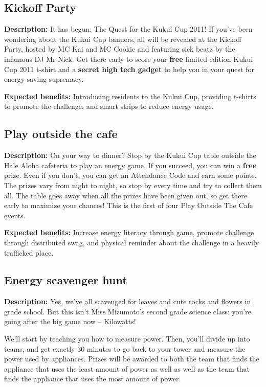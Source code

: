 \subsection{Kickoff Party}

\textbf{Description:} It has begun: The Quest for the Kukui Cup 2011! If you've been wondering about the Kukui Cup banners, all will be revealed at the Kickoff Party, hosted by MC Kai and MC Cookie and featuring sick beatz by the infamous DJ Mr Nick. Get there early to score your \textbf{free} limited edition Kukui Cup 2011 t-shirt and a \textbf{secret high tech gadget} to help you in your quest for energy saving supremacy.

\vspace{2ex}
\textbf{Expected benefits:} Introducing residents to the Kukui Cup, providing t-shirts to promote the challenge, and smart strips to reduce energy usage.


\subsection{Play outside the cafe}

\textbf{Description:} On your way to dinner? Stop by the Kukui Cup table outside the Hale Aloha cafeteria to play an energy game. If you succeed, you can win a \textbf{free} prize. Even if you don't, you can get an Attendance Code and earn some points. The prizes vary from night to night, so stop by every time and try to collect them all. The table goes away when all the prizes have been given out, so get there early to maximize your chances! This is the first of four Play Outside The Cafe events.

\vspace{2ex}
\textbf{Expected benefits:} Increase energy literacy through game, promote challenge through distributed swag, and physical reminder about the challenge in a heavily trafficked place.


\subsection{Energy scavenger hunt}

\textbf{Description:} Yes, we've all scavenged for leaves and cute rocks and flowers in grade school.  But this isn't Miss Mizumoto's second grade science class: you're going after the big game now -- Kilowatts!

We'll start by teaching you how to measure power. Then, you'll divide up into teams, and get exactly 30 minutes to go back to your tower and measure the power used by appliances. Prizes will be awarded to both the team that finds the appliance that uses the least amount of power as well as well as the team that finds the appliance that uses the most amount of power.

